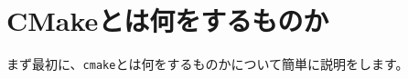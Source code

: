 \newpage
\section{CMakeとは何をするものか}
\label{sec:WhatCMakeWillDo}

\def\Anno#1{\mc{\footnotesize{ \CDots\  #1}}}
\def\SolutionFile{\hbox{ソリューションファイル\raise.3ex\hbox{\small{$^\dagger$}}}}
\def\ProjectFile{\hbox{プロジェクトファイル\raise.4ex\hbox{\small{$^\ddagger$}}}}
\def\cmake{{\tt{cmake}}}
\def\build{{\it{build\/}}}

\noindent
まず最初に、\cmake とは何をするものかについて簡単に説明をします。

